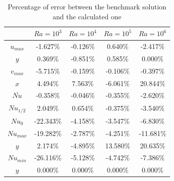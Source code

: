 \begin{table}[h]
	\centering
	\begin{tabular}{c|c|c|c|c|}
		\cline{2-5}
		\multicolumn{1}{l|}{}       & $Ra=10^{3}$ & $Ra=10^{4}$ & $Ra=10^{5}$ & $Ra=10^{6}$ \\ \hline
		\multicolumn{1}{|c|}{$u_{max}$}  & -1.627\%                    & -0.126\%                    & 0.640\%                     & -2.417\%                    \\ \hline
		\multicolumn{1}{|c|}{$y$}     & 0.369\%                     & -0.851\%                    & 0.585\%                     & 0.000\%                     \\ \hline
		\multicolumn{1}{|c|}{$v_{max}$}  & -5.715\%                    & -0.159\%                    & -0.106\%                    & -0.397\%                    \\ \hline
		\multicolumn{1}{|c|}{$x$}     & 4.494\%                     & 7.563\%                     & -6.061\%                    & 20.844\%                    \\ \hline
		\multicolumn{1}{|c|}{$\overbar{Nu}$} & -0.358\%                    & -0.046\%                    & -0.355\%                    & -2.620\%                    \\ \hline
		\multicolumn{1}{|c|}{$Nu_{1/2}$}  & 2.049\%                     & 0.654\%                     & -0.375\%                    & -3.540\%                    \\ \hline
		\multicolumn{1}{|c|}{$Nu_{0}$}   & -22.343\%                   & -4.158\%                    & -3.547\%                    & -6.830\%                    \\ \hline
		\multicolumn{1}{|c|}{$Nu_{max}$} & -19.282\%                   & -2.787\%                    & -4.251\%                    & -11.681\%                   \\ \hline
		\multicolumn{1}{|c|}{$y$}     & 2.174\%                     & -4.895\%                    & 13.580\%                    & 20.635\%                    \\ \hline
		\multicolumn{1}{|c|}{$Nu_{min}$} & -26.116\%                   & -5.128\%                    & -4.742\%                    & -7.386\%                    \\ \hline
		\multicolumn{1}{|c|}{$y$}     & 0.000\%                     & 0.000\%                     & 0.000\%                     & 0.000\%                     \\ \hline
	\end{tabular}
	\caption{Percentage of error between the benchmark solution and the calculated one}
	\label{ErrorDiffHeated}
\end{table}